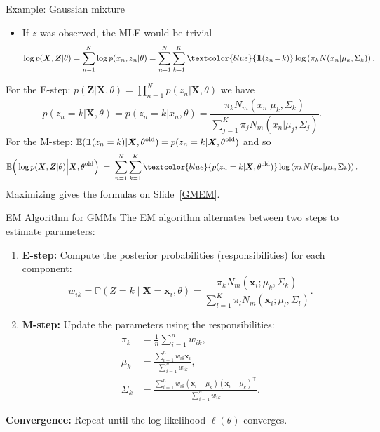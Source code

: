 \documentclass[11pt,handout,aspectratio=169]{beamer}
\begin{document}
\begin{frame}{Example: Gaussian mixture}
\begin{itemize}
	\item If $z$ was observed, the MLE would be trivial
	$${\small \log p(\boldsymbol X,\boldsymbol Z|\theta)=\sum_{n=1}^N \log p(x_n,z_n|\theta)=\sum_{n=1}^N\sum_{k=1}^K \textcolor{blue}{1\!\!1(z_n\!=\!k)}\log\left(\pi_kN(x_n|\mu_k,\Sigma_k)\right).}$$
\end{itemize}
For the E-step: $p(\boldsymbol{Z}|\boldsymbol{X},\theta)=\prod_{n=1}^N p(z_n|\boldsymbol{X},\theta)$ we have
$$
p(z_n=k|\boldsymbol{X},\theta)=p(z_n=k|x_n,\theta)=\frac{\pi_k N_m(x_n|\mu_k,\Sigma_k)}{\sum_{j=1}^K \pi_j N_m(x_n|\mu_j,\Sigma_j)}.
$$
For the M-step: ${\small \mathbb E(1\!\!1(z_n=k)|\boldsymbol{X},\theta^{\rm old})=p(z_n=k|\boldsymbol{X},\theta^{\rm old})}$ and so 
$$
{\small \mathbb E\Big(\log p(\boldsymbol X,\boldsymbol Z|\theta)\Big|\boldsymbol{X},\theta^{\rm old}\Big)\;=\;\sum_{n=1}^N\sum_{k=1}^K \textcolor{blue}{p(z_n=k|\boldsymbol{X},\theta^{\rm old})}\log\left(\pi_kN(x_n|\mu_k,\Sigma_k)\right).}
$$
Maximizing gives the formulas on Slide~\ref{GMEM}.
\end{frame}



\begin{frame}{EM Algorithm for GMMs}
The EM algorithm alternates between two steps to estimate parameters:
\begin{enumerate}
    \item \textbf{E-step:} Compute the posterior probabilities (responsibilities) for each component:
    \[
    w_{ik} = \mathbb{P}(Z = k \mid \mathbf{X} = \mathbf{x}_i, \theta) = 
    \frac{\pi_k N_m(\mathbf{x}_i; \mu_k, \Sigma_k)}{\sum_{l=1}^K \pi_l N_m(\mathbf{x}_i; \mu_l, \Sigma_l)}.
    \]

    \item \textbf{M-step:} Update the parameters using the responsibilities:
    \begin{align*}
        \pi_k &= \frac{1}{n} \sum_{i=1}^n w_{ik}, \\
        \mu_k &= \frac{\sum_{i=1}^n w_{ik} \mathbf{x}_i}{\sum_{i=1}^n w_{ik}}, \\
        \Sigma_k &= \frac{\sum_{i=1}^n w_{ik} (\mathbf{x}_i - \mu_k)(\mathbf{x}_i - \mu_k)^\top}{\sum_{i=1}^n w_{ik}}.
    \end{align*}
\end{enumerate}

\textbf{Convergence:} Repeat until the log-likelihood \( \ell(\theta) \) converges.
\end{frame}
\end{document}
